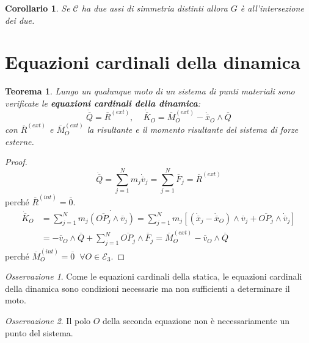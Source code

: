 \documentclass{book}
\theoremstyle{plain}
\newtheorem{teo}{Teorema}[chapter]
\theoremstyle{plain}
\theoremstyle{plain}
\theoremstyle{plain}
\newtheorem*{cor}{Corollario}
\theoremstyle{plain}
\theoremstyle{definition}
\theoremstyle{remark}
\newtheorem*{oss}{Osservazione}
\theoremstyle{definition}
\begin{document}
\begin{cor}
    Se $\mathcal{C}$ ha due assi di simmetria distinti allora $G$ è all'intersezione dei due.
\end{cor}

\section{Equazioni cardinali della dinamica}

\begin{teo}
    Lungo un qualunque moto di un sistema di punti materiali sono verificate le \textbf{equazioni cardinali della dinamica}:
    \begin{displaymath}
    \boxed{
        \dot{\overline{Q}}=\overline{R}^{(ext)}, \ \ \ \ \ \dot{\overline{K}}_O=\overline{M}_O^{(ext)}-\dot{\overline{x}}_O\wedge\overline{Q}
        }
    \end{displaymath}
    con $\overline{R}^{(ext)}$ e $\overline{M}_O^{(ext)}$ la risultante e il momento risultante del sistema di forze esterne.
\end{teo}

\begin{proof}
    \begin{displaymath}
        \Dot{\overline{Q}}=\sum_{j=1}^Nm_j\Dot{\overline{v}}_j=\sum_{j=1}^N\overline{F}_j=\overline{R}^{(ext)}
    \end{displaymath}
     perché $\overline{R}^{(int)}=\overline{0}$.
    \[
    \begin{split}
        \Dot{\overline{K}}_O&=\sum_{j=1}^Nm_j\Dot{\left(\overline{OP_j}\wedge\overline{v}_j\right)}=\sum_{j=1}^Nm_j\left[\left(\Dot{\overline{x}}_j-\Dot{\overline{x}}_O\right)\wedge\overline{v}_j+\overline{OP_j}\wedge\Dot{\overline{v}}_j\right] \\
        &=-\overline{v}_O\wedge\overline{Q}+\sum_{j=1}^N\overline{OP_j}\wedge\overline{F}_j=\overline{M}_O^{(ext)}-\overline{v}_O\wedge\overline{Q}
    \end{split}
    \]
     perché $\overline{M}_O^{(int)}=\overline{0} \;\; \forall O \in \mathcal{E}_3$.
\end{proof}

\begin{oss}
     Come le equazioni cardinali della statica, le equazioni cardinali della dinamica sono condizioni necessarie ma non sufficienti a determinare il moto.
\end{oss}

\begin{oss}
    Il polo $O$ della seconda equazione non è necessariamente un punto del sistema.
\end{oss}
\end{document}
